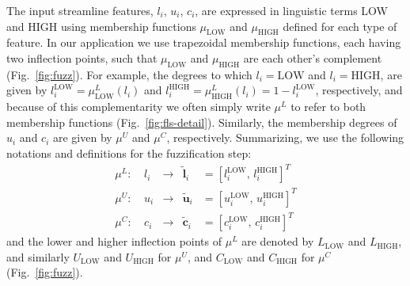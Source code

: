 \documentclass[twocolumn,natbib]{svjour3}
\begin{document}
The input streamline features, $l_{i}$, $u_{i}$, $c_{i}$, are expressed in linguistic terms LOW and HIGH using membership functions $\mu_{\textrm{LOW}}$ and $\mu_{\textrm{HIGH}}$ defined for each type of feature. In our application we use trapezoidal membership functions, each having two inflection points, such that $\mu_{\textrm{LOW}}$ and $\mu_{\textrm{HIGH}}$ are each other's complement (Fig.~\ref{fig:fuzz}). For example, the degrees to which $l_{i}=\textrm{LOW}$ and $l_{i}=\textrm{HIGH}$, are given by $l_{i}^{\textrm{LOW}}=\mu^{L}_{\textrm{LOW}}(l_{i})$ and $l_{i}^{\textrm{HIGH}}=\mu^{L}_{\textrm{HIGH}}(l_{i})=1-l_{i}^{\textrm{LOW}}$, respectively, and because of this complementarity we often simply write $\mu^{L}$ to refer to both membership functions (Fig.~\ref{fig:fls-detail}). Similarly, the membership degrees of $u_{i}$ and $c_{i}$ are given by $\mu^{U}$ and $\mu^{C}$, respectively. Summarizing, we use the following notations and definitions for the fuzzification step:
\begin{equation}
\begin{array}{lcccl}
\mu^{L}\!:\ & l_{i} & \rightarrow & \tilde{\mathbf{l}}_{i} & = \left[l_{i}^{\textrm{LOW}}\!,\, l_{i}^{\textrm{HIGH}}\right]^T \\[1ex]
\mu^{U}\!:\ & u_{i} & \rightarrow & \tilde{\mathbf{u}}_{i} & = \left[u_{i}^{\textrm{LOW}}\!,\, u_{i}^{\textrm{HIGH}}\right]^T \\[1ex]
\mu^{C}\!:\ & c_{i} & \rightarrow & \tilde{\mathbf{c}}_{i} & = \left[c_{i}^{\textrm{LOW}}\!,\, c_{i}^{\textrm{HIGH}}\right]^T
\end{array}
\end{equation}
and the lower and higher inflection points of $\mu^{L}$ are denoted by $L_{\textrm{LOW}}$ and $L_{\textrm{HIGH}}$, and similarly $U_{\textrm{LOW}}$ and $U_{\textrm{HIGH}}$ for $\mu^{U}$, and $C_{\textrm{LOW}}$ and $C_{\textrm{HIGH}}$ for $\mu^{C}$ (Fig.~\ref{fig:fuzz}).
\end{document}
